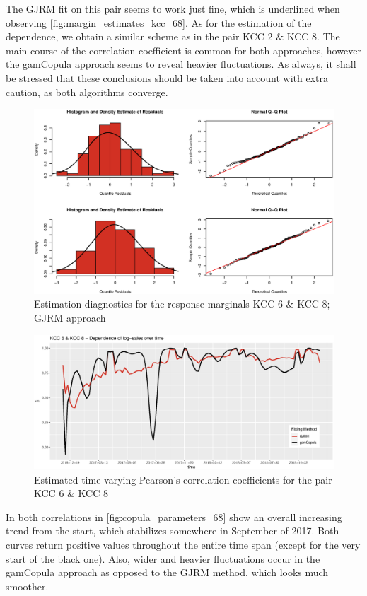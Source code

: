 The \ac{GJRM} fit on this pair seems to work just fine, which is underlined when observing \autoref{fig:margin_estimates_kcc_68}. As for the estimation of the dependence, we obtain a similar scheme as in the pair \ac{KCC} 2 \& \ac{KCC} 8. The main course of the correlation coefficient is common for both approaches, however the gamCopula approach seems to reveal heavier fluctuations. As always, it shall be stressed that these conclusions should be taken into account with extra caution, as both algorithms converge.

\begin{figure}[H]
\centering
  \includegraphics[width=0.9\linewidth]{figures/margin_estimates_kcc_68.eps}
  \caption{Estimation diagnostics for the response marginals KCC 6 \& KCC 8; \ac{GJRM} approach}
  \label{fig:margin_estimates_kcc_68}
\end{figure}
 



\begin{figure}[H]
\centering
  \includegraphics[width=0.9\linewidth]{figures/copula_parameters_68.eps}
  \caption{Estimated time-varying Pearson's correlation coefficients for the pair KCC 6 \& KCC 8}
  \label{fig:copula_parameters_68}
\end{figure}



In both correlations in \autoref{fig:copula_parameters_68} show an overall increasing trend from the start, which stabilizes somewhere in September of 2017. Both curves return positive values throughout the entire time span (except for the very start of the black one). Also, wider and heavier fluctuations occur in the gamCopula approach as opposed to the \ac{GJRM} method, which looks much smoother.